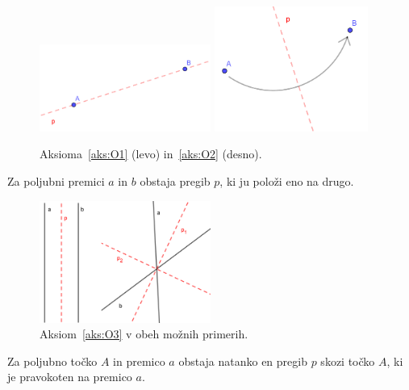 \begin{figure}[h!]
    \centering
    \includegraphics[width=0.5\textwidth]{images/origami_aksiomi/O1.png}
    \includegraphics[width=0.45\textwidth]{images/origami_aksiomi/O2.png}
    \caption[Aksioma~\ref{aks:O1} in~\ref{aks:O2}]{Aksioma~\ref{aks:O1} (levo) in~\ref{aks:O2} (desno).}
    \label{fig:O1_in_O2}
\end{figure}

\begin{aksiom}
    \label{aks:O3}
    Za poljubni premici $a$ in $b$ obstaja pregib $p$, ki ju položi eno na drugo.
\end{aksiom}

\begin{figure}[h!]
    \centering
    \includegraphics[width=0.5\textwidth]{images/origami_aksiomi/O3.png}
    \caption[Aksiom~\ref{aks:O3}]{Aksiom~\ref{aks:O3} v obeh možnih primerih.}
    \label{fig:O3}
\end{figure}

\begin{aksiom}
    \label{aks:O4}
    Za poljubno točko $A$ in premico $a$ obstaja natanko en pregib $p$ skozi točko $A$, ki je pravokoten na premico $a$.
\end{aksiom}

